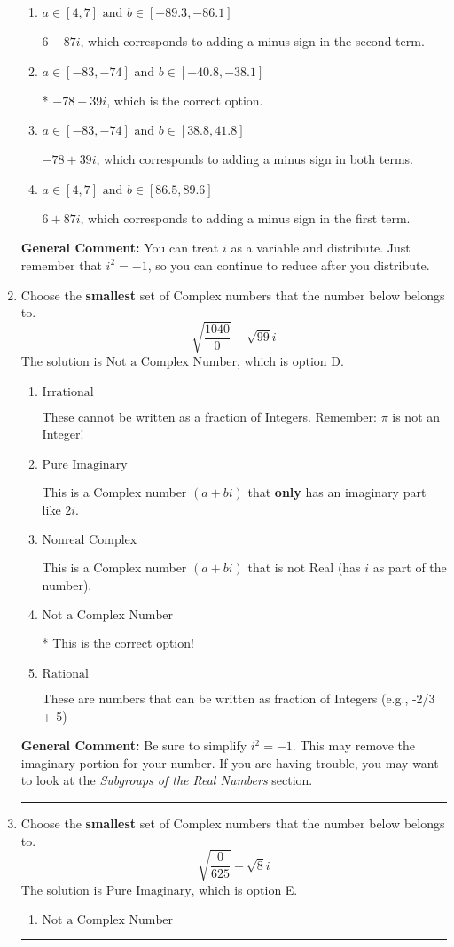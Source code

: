 \documentclass{extbook}[14pt]
\newcommand{\litem}[1]{\item #1

\rule{\textwidth}{0.4pt}}
\begin{document}
\begin{enumerate}
{\begin{enumerate}[label=\Alph*.]
 $-36 + 42 i$, which corresponds to just multiplying the real terms to get the real part of the solution and the coefficients in the complex terms to get the complex part.
\item \( a \in [4, 7] \text{ and } b \in [-89.3, -86.1] \)

 $6 - 87 i$, which corresponds to adding a minus sign in the second term.
\item \( a \in [-83, -74] \text{ and } b \in [-40.8, -38.1] \)

* $-78 - 39 i$, which is the correct option.
\item \( a \in [-83, -74] \text{ and } b \in [38.8, 41.8] \)

 $-78 + 39 i$, which corresponds to adding a minus sign in both terms.
\item \( a \in [4, 7] \text{ and } b \in [86.5, 89.6] \)

 $6 + 87 i$, which corresponds to adding a minus sign in the first term.
\end{enumerate}

\textbf{General Comment:} You can treat $i$ as a variable and distribute. Just remember that $i^2=-1$, so you can continue to reduce after you distribute.
}
\litem{
Choose the \textbf{smallest} set of Complex numbers that the number below belongs to.
\[ \sqrt{\frac{1040}{0}}+\sqrt{99} i \]The solution is \( \text{Not a Complex Number} \), which is option D.\begin{enumerate}[label=\Alph*.]
\item \( \text{Irrational} \)

These cannot be written as a fraction of Integers. Remember: $\pi$ is not an Integer!
\item \( \text{Pure Imaginary} \)

This is a Complex number $(a+bi)$ that \textbf{only} has an imaginary part like $2i$.
\item \( \text{Nonreal Complex} \)

This is a Complex number $(a+bi)$ that is not Real (has $i$ as part of the number).
\item \( \text{Not a Complex Number} \)

* This is the correct option!
\item \( \text{Rational} \)

These are numbers that can be written as fraction of Integers (e.g., -2/3 + 5)
\end{enumerate}

\textbf{General Comment:} Be sure to simplify $i^2 = -1$. This may remove the imaginary portion for your number. If you are having trouble, you may want to look at the \textit{Subgroups of the Real Numbers} section.
}
\litem{
Choose the \textbf{smallest} set of Complex numbers that the number below belongs to.
\[ \sqrt{\frac{0}{625}}+\sqrt{8}i \]The solution is \( \text{Pure Imaginary} \), which is option E.\begin{enumerate}[label=\Alph*.]
\item \( \text{Not a Complex Number} \)


\end{enumerate}}
\end{enumerate}
\end{document}
